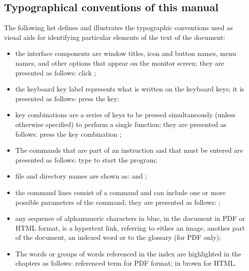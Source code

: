 \subsection{Typographical conventions of this manual \label{introduction-manual-conventions}}

The following list defines and illustrates the typographic conventions used as visual aids for identifying particular elements of the text of the document:

\begin{itemize}%
	\item the interface components are window titles, icon and button names, menu names, and other options that appear on the monitor screen; they are presented as follows: \newline
\hspace {1.5cm} click ;
	\item the keyboard key label represents what is written on the keyboard keys; it is presented as follows: \newline
\hspace {1.5cm} press the  key;
	\item key combinations are a series of keys to be pressed simultaneously (unless otherwise specified) to perform a single function; they are presented as follows: \newline
\hspace {1.5cm} press the key combination  ;
	\item The commands that are part of an instruction and that must be entered are presented as follows:\newline
\hspace {1.5cm} type  to start the program;
	\item file and directory names are shown as: \newline
\hspace {1.5cm}  and ;
	\item the command lines consist of a command and can include one or more possible parameters of the command; they are presented as follows: \newline
\hspace {1.5cm} ;
	\item any sequence of alphanumeric characters in blue, in the document in PDF or HTML format, is a hypertext link, referring to either an image, another part of the document, an indexed word or to the glossary (for PDF only);
	\item The words or groups of words referenced in the index are highlighted in the chapters as follows:\newline
\hspace {1.5cm} \textsf{referenced term} for PDF format; \newline
\hspace {1.5cm} in brown for HTML.
\end{itemize}

